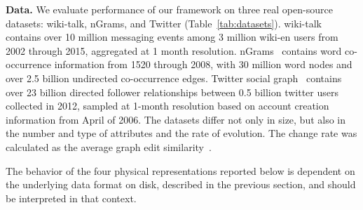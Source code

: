 {\bf Data.}  We evaluate performance of our framework on three real
open-source datasets: wiki-talk, nGrams, and Twitter
(Table~\ref{tab:datasets}).  wiki-talk~\cite{wikitalk} contains over
10 million messaging events among 3 million wiki-en users from 2002
through 2015, aggregated at 1 month resolution.  nGrams~\cite{nGrams}
contains word co-occurrence information from 1520 through 2008, with
30 million word nodes and over 2.5 billion undirected co-occurrence
edges.  Twitter social graph~\cite{Gabielkov:2014:SSN:2591971.2591985}
contains over 23 billion directed follower relationships between 0.5
billion twitter users collected in 2012, sampled at 1-month resolution
based on account creation information from April of 2006.  The
datasets differ not only in size, but also in the number and type of
attributes and the rate of evolution.  The change rate was calculated
as the average graph edit similarity~\cite{Ren2011}.  

The behavior of the four physical representations reported below is
dependent on the underlying data format on disk, described in the
previous section, and should be interpreted in that context.

